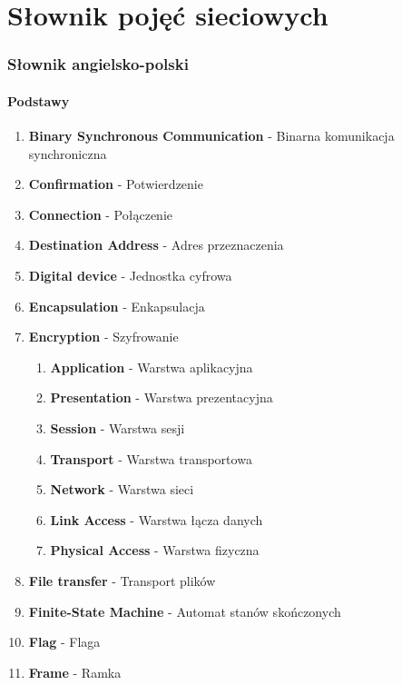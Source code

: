 \newcommand{\elementPL}[2]{\textbf{#1} - #2}
\newcommand{\elementANG}[2]{\textbf{#2} - #1}

\newpage
\part{Słownik pojęć sieciowych}

\section{Słownik angielsko-polski}
	\subsection{Podstawy}
		\begin{enumerate}
			\item \elementPL{Binary Synchronous Communication}{Binarna komunikacja synchroniczna}
			\item \elementPL{Confirmation}{Potwierdzenie}
			\item \elementPL{Connection}{Połączenie}
			\item \elementPL{Destination Address}{Adres przeznaczenia}
			\item \elementPL{Digital device}{Jednostka cyfrowa}
			\item \elementPL{Encapsulation}{Enkapsulacja}
			\item \elementPL{Encryption}{Szyfrowanie}
			\begin{enumerate}
				\item \elementPL{Application}{Warstwa aplikacyjna}
				\item \elementPL{Presentation}{Warstwa prezentacyjna}
				\item \elementPL{Session}{Warstwa sesji}
				\item \elementPL{Transport}{Warstwa transportowa}
				\item \elementPL{Network}{Warstwa sieci}
				\item \elementPL{Link Access}{Warstwa łącza danych}
				\item \elementPL{Physical Access}{Warstwa fizyczna}
			\end{enumerate}
			\item \elementPL{File transfer}{Transport plików}
			\item \elementPL{Finite-State Machine}{Automat stanów skończonych}
			\item \elementPL{Flag}{Flaga}
			\item \elementPL{Frame}{Ramka}

\end{enumerate}
